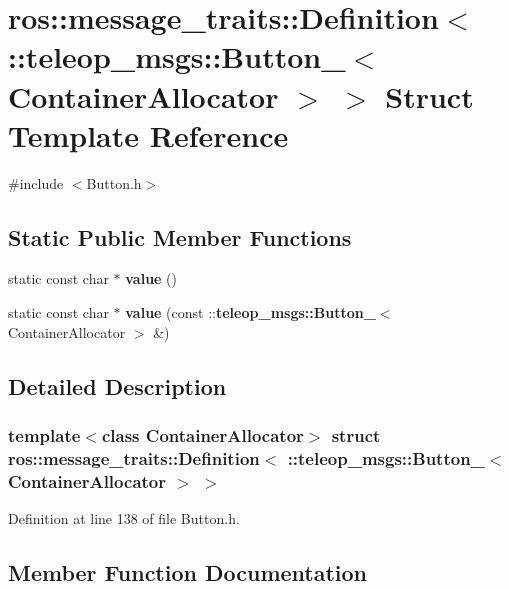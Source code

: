 \section{ros::message\_\-traits::Definition$<$ ::teleop\_\-msgs::Button\_\-$<$ ContainerAllocator $>$ $>$ Struct Template Reference}
\label{structros_1_1message__traits_1_1Definition_3_01_1_1teleop__msgs_1_1Button___3_01ContainerAllocator_01_4_01_4}


{\ttfamily \#include $<$Button.h$>$}

\subsection*{Static Public Member Functions}
\begin{DoxyCompactItemize}
\item 
static const char $\ast$ {\bf value} ()
\item 
static const char $\ast$ {\bf value} (const ::{\bf teleop\_\-msgs::Button\_\-}$<$ ContainerAllocator $>$ \&)
\end{DoxyCompactItemize}


\subsection{Detailed Description}
\subsubsection*{template$<$class ContainerAllocator$>$ struct ros::message\_\-traits::Definition$<$ ::teleop\_\-msgs::Button\_\-$<$ ContainerAllocator $>$ $>$}



Definition at line 138 of file Button.h.



\subsection{Member Function Documentation}
